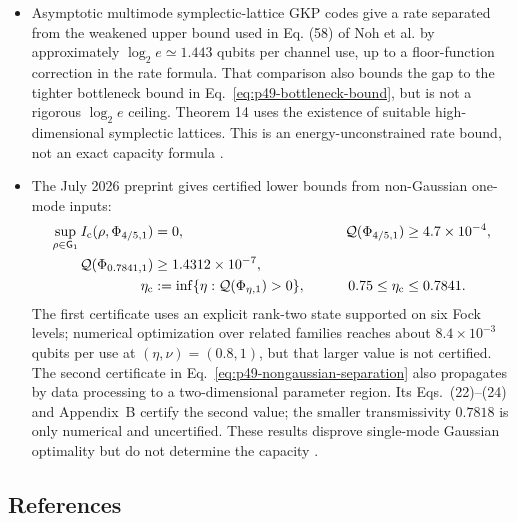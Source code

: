 \begin{itemize}
  \item Asymptotic multimode symplectic-lattice GKP codes give a rate separated from the weakened upper bound used in Eq. (58) of Noh et al. by approximately $\log_2 e\simeq1.443$ qubits per channel use, up to a floor-function correction in the rate formula. That comparison also bounds the gap to the tighter bottleneck bound in Eq.~\eqref{eq:p49-bottleneck-bound}, but is not a rigorous $\log_2 e$ ceiling. Theorem 14 uses the existence of suitable high-dimensional symplectic lattices. This is an energy-unconstrained rate bound, not an exact capacity formula .

  \item The July 2026 preprint gives certified lower bounds from non-Gaussian one-mode inputs:
  \begin{equation}
    \begin{aligned}
      \sup_{\rho\in\mathsf G_1}I_{\rm c}(\rho,\Phi_{4/5,1})
        &=0,
      &\qquad
      \mathcal Q(\Phi_{4/5,1})
        &\geq4.7\times10^{-4},\\
      \mathcal Q(\Phi_{0.7841,1})
        &\geq1.4312\times10^{-7},\\
      \eta_{\rm c}
        &:=\inf\{\eta:\mathcal Q(\Phi_{\eta,1})>0\},
      &\qquad
      0.75\leq\eta_{\rm c}
        &\leq0.7841.
    \end{aligned}
    \label{eq:p49-nongaussian-separation}
  \end{equation}
  The first certificate uses an explicit rank-two state supported on six
  Fock levels; numerical optimization over related families reaches about
  $8.4\times10^{-3}$ qubits per use at $(\eta,\nu)=(0.8,1)$, but that larger
  value is not certified.  The second certificate in
  Eq.~\eqref{eq:p49-nongaussian-separation} also propagates by data processing
  to a two-dimensional parameter region.  Its Eqs.~(22)--(24) and Appendix~B certify the second value; the smaller transmissivity $0.7818$ is only numerical and uncertified. These results disprove
  single-mode Gaussian optimality but do not determine the capacity
  .
\end{itemize}

\subsection*{References}

